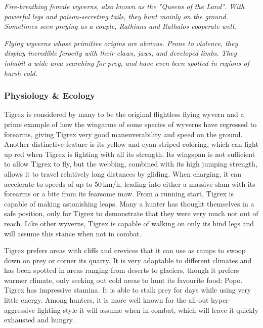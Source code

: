 \textit{Fire-breathing female wyverns, also known as the "Queens of the Land". With powerful legs and poison-secreting tails, they hunt mainly on the ground. Sometimes seen preying as a couple, Rathians and Rathalos cooperate well.}

\textit{Flying wyverns whose primitive origins are obvious. Prone to violence, they display incredible ferocity with their claws, jaws, and developed limbs. They inhabit a wide area searching for prey, and have even been spotted in regions of harsh cold.}
\subsubsection{Physiology \& Ecology}
Tigrex is considered by many to be the original flightless flying wyvern and a prime example of how the wingarms of some species of wyverns have regressed to forearms, giving Tigrex very good maneuverability and speed on the ground. Another distinctive feature is its yellow and cyan striped coloring, which can light up red when Tigrex is fighting with all its strength. Its wingspan is not sufficient to allow Tigrex to fly, but the webbing, combined with its high jumping strength, allows it to travel relatively long distances by gliding. When charging, it can accelerate to speeds of up to 50\,km/h, leading into either a massive slam with its forearms or a bite from its fearsome maw. From a running start, Tigrex is capable of making astonishing leaps. Many a hunter has thought themselves in a safe position, only for Tigrex to demonstrate that they were very much not out of reach. Like other wyverns, Tigrex is capable of walking on only its hind legs and will assume this stance when not in combat.

Tigrex prefers areas with cliffs and crevices that it can use as ramps to swoop down on prey or corner its quarry. It is very adaptable to different climates and has been spotted in areas ranging from deserts to glaciers, though it prefers warmer climate, only seeking out cold areas to hunt its favourite food: Popo. Tigrex has impressive stamina. It is able to stalk prey for days while using very little energy. Among hunters, it is more well known for the all-out hyper-aggressive fighting style it will assume when in combat, which will leave it quickly exhausted and hungry.

